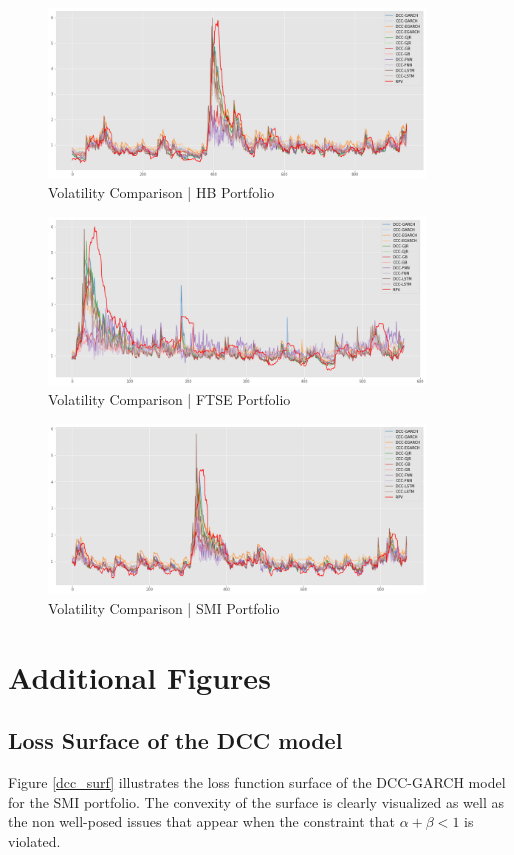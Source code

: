 \documentclass[a4paper, oneside]{discothesis}
\begin{document}
\begin{figure}[H]
    \centering
    \includegraphics[width = 10cm]{figures/HB_vola.png}
    \caption{Volatility Comparison | HB Portfolio}
    \label{fig:my_label}
\end{figure}
\begin{figure}[H]
    \centering
    \includegraphics[width = 10cm]{figures/FTSE_vola.png}
    \caption{Volatility Comparison | FTSE Portfolio}
    \label{fig:my_label}
\end{figure}
\begin{figure}[H]
    \centering
    \includegraphics[width = 10cm]{figures/SMI_vola.png}
    \caption{Volatility Comparison | SMI Portfolio}
    \label{fig:my_label}
\end{figure}

\section{Additional Figures}

\subsection{Loss Surface of the DCC model}
Figure \ref{dcc_surf} illustrates the loss function surface of the DCC-GARCH model for the SMI portfolio. The convexity of the surface is clearly visualized as well as the non well-posed issues that appear when the constraint that $\alpha+\beta<1$ is violated.
\end{document}
